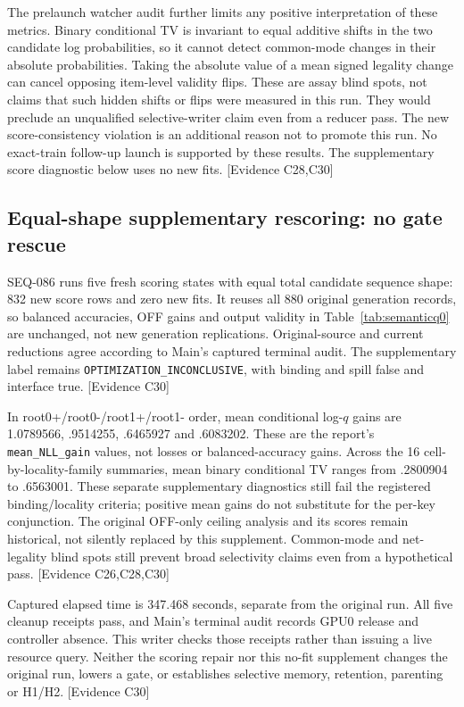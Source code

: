 \documentclass[11pt]{article}
\newcommand{\ev}[1]{\textsf{[Evidence #1]}}
\begin{document}
The prelaunch watcher audit further limits any positive interpretation of these
metrics. Binary conditional TV is invariant to equal additive shifts in the
two candidate log probabilities, so it cannot detect common-mode changes in
their absolute probabilities. Taking the absolute value of a mean signed
legality change can cancel opposing item-level validity flips. These are assay
blind spots, not claims that such hidden shifts or flips were measured in this
run. They would preclude an unqualified selective-writer claim even from a
reducer pass. The new score-consistency violation is an additional reason not
to promote this run. No exact-train follow-up launch is supported by these
results. The supplementary score diagnostic below uses no new fits. \ev{C28,C30}

\subsection{Equal-shape supplementary rescoring: no gate rescue}
SEQ-086 runs five fresh scoring states with equal total candidate sequence
shape: 832 new score rows and zero new fits. It reuses all 880 original
generation records, so balanced accuracies, OFF gains and output validity in
Table~\ref{tab:semanticq0} are unchanged, not new generation replications.
Original-source and current reductions agree according to Main's captured
terminal audit. The supplementary label remains
\texttt{OPTIMIZATION\_INCONCLUSIVE}, with binding and spill false and interface
true. \ev{C30}

In root0+/root0-/root1+/root1- order, mean conditional log-$q$ gains are
1.0789566, .9514255, .6465927 and .6083202. These are the report's
\texttt{mean\_NLL\_gain} values, not losses or balanced-accuracy gains.
Across the 16 cell-by-locality-family summaries, mean binary conditional TV
ranges from .2800904 to .6563001. These separate supplementary diagnostics
still fail the registered binding/locality criteria; positive mean gains do
not substitute for the per-key conjunction. The original OFF-only ceiling
analysis and its scores remain historical, not silently replaced by this
supplement. Common-mode and net-legality blind spots still prevent broad
selectivity claims even from a hypothetical pass. \ev{C26,C28,C30}

Captured elapsed time is 347.468 seconds, separate from the original run.
All five cleanup receipts pass, and Main's terminal audit records GPU0 release
and controller absence. This writer checks those receipts rather than issuing
a live resource query. Neither the scoring repair nor this no-fit supplement
changes the original run, lowers a gate, or establishes selective memory,
retention, parenting or H1/H2. \ev{C30}
\end{document}
